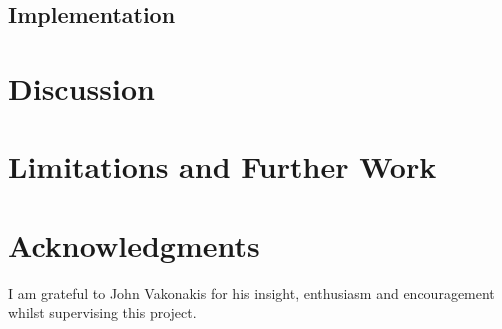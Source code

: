 \documentclass[fleqn,10pt]{article} %
\begin{document}
\subsection{Implementation}



\section{Discussion}




\section{Limitations and Further Work}


\section*{Acknowledgments}

I am grateful to John Vakonakis for his insight, enthusiasm and encouragement whilst supervising this project.





\end{document}
